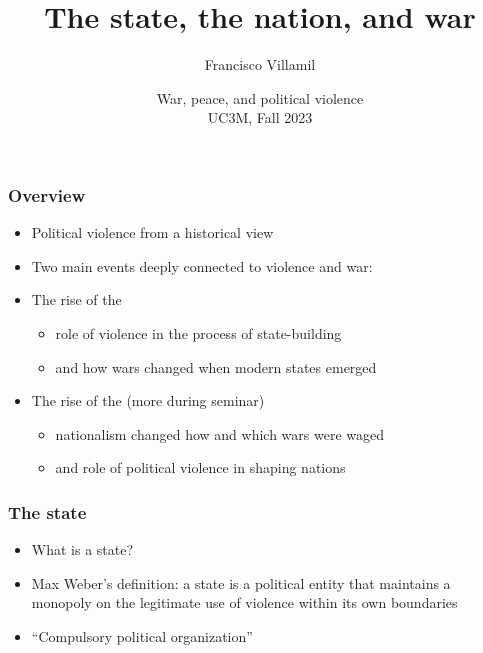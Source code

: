 \documentclass[aspectratio=43]{beamer}
\title{\huge The state, the nation, and war}
\author{Francisco Villamil}
\date{War, peace, and political violence\\UC3M, Fall 2023}
\begin{document}
\begin{frame}
  \titlepage
\end{frame}

\begin{frame}
\frametitle{Overview}
\centering

\begin{itemize}
  \item Political violence from a historical view
  \item Two main events deeply connected to violence and war:
  \item<2->[1.] The rise of the 
  \begin{itemize}
    \item role of violence in the process of state-building
    \item and how wars changed when modern states emerged
  \end{itemize}
  \item<3->[2.] The rise of the  (more during seminar)
  \begin{itemize}
    \item nationalism changed how and which wars were waged
    \item and role of political violence in shaping nations
  \end{itemize}
\end{itemize}

\end{frame}



\begin{frame}
\frametitle{The state}
\centering

\begin{itemize}
\item What is a state?
\item Max Weber's definition: a state is a political entity that maintains a monopoly on the legitimate use of violence within its own boundaries
\item ``Compulsory political organization''
\end{itemize}

\end{frame}
\end{document}
